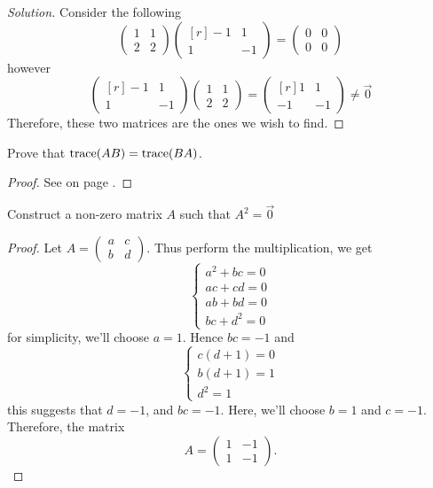 \documentclass{article}
\begin{document}
\begin{proof}[Solution]
  Consider the following
  \[
    \begin{pmatrix}
      1&1\\2&2
    \end{pmatrix}
    \begin{pmatrix*}[r]
      -1 &1\\ 1&-1
    \end{pmatrix*}=
    \begin{pmatrix}
      0&0\\0&0
    \end{pmatrix}
  \]
  however
  \[
    \begin{pmatrix*}[r]
      -1 &1\\ 1&-1
    \end{pmatrix*}
    \begin{pmatrix}
      1&1\\2&2
    \end{pmatrix}=
    \begin{pmatrix*}[r]
      1&1\\-1&-1
    \end{pmatrix*}\neq \vec{0}
  \]
  Therefore, these two matrices are the ones we wish to find.
\end{proof}
\begin{exercise}
  Prove that $\operatorname{trace}(AB)=\operatorname{trace}(BA)$.
\end{exercise}
\begin{proof}
  See on page \pageref{_trace}.
\end{proof}
\begin{exercise}
  Construct a non-zero matrix $A$ such that $A^2=\vec{0}$
\end{exercise}
\begin{proof}
  Let $A=\begin{pmatrix} a&c\\b&d \end{pmatrix}$. Thus
  perform the multiplication, we get
  \[
    \begin{cases}
      a^2 + bc=0\\
      ac+cd=0\\
      ab+bd=0\\
      bc+d^2=0
    \end{cases}
  \]
  for simplicity, we'll choose $a=1$. Hence $bc=-1$ and
  \[
    \begin{cases}
      c(d+1)=0\\
      b(d+1)=1\\
      d^2=1
    \end{cases}
  \]
  this suggests that $d=-1$, and $bc=-1$. Here, we'll choose $b=1$
  and $c=-1$. Therefore, the matrix
  \[ A=\begin{pmatrix}1&-1\\1&-1\end{pmatrix}. \]
\end{proof}
\end{document}
